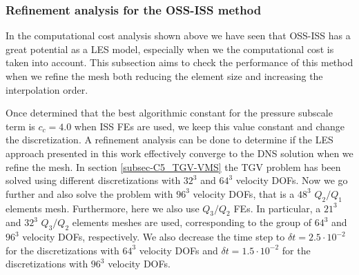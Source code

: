\subsubsection{Refinement analysis for the OSS-ISS method}
In the computational cost analysis shown above we have seen that OSS-ISS has a great potential as a LES model, especially when we the computational cost is taken into account. This subsection aims to check the performance of this method when we refine the mesh both reducing the element size and increasing the interpolation order. 

Once determined that the best algorithmic constant for the pressure subscale term is $c_c=4.0$ when ISS FEs are used, we keep this value constant and change the discretization. A refinement analysis can be done to determine if the LES approach presented in this work effectively converge to the DNS solution when we refine the mesh. In section \ref{subsec-C5_TGV-VMS} the TGV problem has been solved using different discretizations with $32^3$ and $64^3$ velocity DOFs. Now we go further and also solve the problem with $96^3$ velocity DOFs, that is a $48^3$ $Q_2/Q_1$ elements mesh. Furthermore, here we also use $Q_3/Q_2$ FEs. In particular, a $21^3$ and $32^3$ $Q_3/Q_2$ elements meshes are used, corresponding to the group of $64^3$ and $96^3$ velocity DOFs, respectively. We also decrease the time step to $\delta t=2.5\cdot10^{-2}$ for the discretizations with $64^3$ velocity DOFs and $\delta t=1.5\cdot10^{-2}$ for the discretizations with $96^3$ velocity DOFs.

